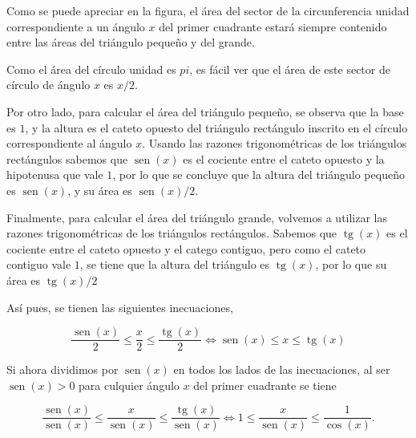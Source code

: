 \documentclass[
  spanish,
  a4paper,
]{scrreport}
\theoremstyle{definition}
\theoremstyle{remark}
\begin{document}
\begin{tcolorbox}[enhanced jigsaw, arc=.35mm, bottomrule=.15mm, bottomtitle=1mm, breakable, colback=white, colbacktitle=quarto-callout-tip-color!10!white, colframe=quarto-callout-tip-color-frame, coltitle=black, left=2mm, leftrule=.75mm, opacityback=0, opacitybacktitle=0.6, rightrule=.15mm, title=\textcolor{quarto-callout-tip-color}{\faLightbulb}\hspace{0.5em}{Solución}, titlerule=0mm, toprule=.15mm, toptitle=1mm]

Como se puede apreciar en la figura, el área del sector de la
circunferencia unidad correspondiente a un ángulo \(x\) del primer
cuadrante estará siempre contenido entre las áreas del triángulo pequeño
y del grande.

Como el área del círculo unidad es \(pi\), es fácil ver que el área de
este sector de círculo de ángulo \(x\) es \(x/2\).

Por otro lado, para calcular el área del triángulo pequeño, se observa
que la base es \(1\), y la altura es el cateto opuesto del triángulo
rectángulo inscrito en el círculo correspondiente al ángulo \(x\).
Usando las razones trigonométricas de los triángulos rectángulos sabemos
que \(\operatorname{sen}(x)\) es el cociente entre el cateto opuesto y
la hipotenusa que vale \(1\), por lo que se concluye que la altura del
triángulo pequeño es \(\operatorname{sen}(x)\), y su área es
\(\operatorname{sen}(x)/2\).

Finalmente, para calcular el área del triángulo grande, volvemos a
utilizar las razones trigonométricas de los triángulos rectángulos.
Sabemos que \(\operatorname{tg}(x)\) es el cociente entre el cateto
opuesto y el catego contiguo, pero como el cateto contiguo vale \(1\),
se tiene que la altura del triángulo es \(\operatorname{tg}(x)\), por lo
que su área es \(\operatorname{tg}(x)/2\)

Así pues, se tienen las siguientes inecuaciones,

\[
\frac{\operatorname{sen}(x)}{2}\leq \frac{x}{2}\leq \frac{\operatorname{tg}(x)}{2}
\Leftrightarrow \operatorname{sen}(x)\leq x\leq \operatorname{tg}(x)
\]

Si ahora dividimos por \(\operatorname{sen}(x)\) en todos los lados de
las inecuaciones, al ser \(\operatorname{sen}(x)>0\) para culquier
ángulo \(x\) del primer cuadrante se tiene

\[
\frac{\operatorname{sen}(x)}{\operatorname{sen}(x)}\leq \frac{x}{\operatorname{sen}(x)}\leq \frac{\operatorname{tg}(x)}{\operatorname{sen}(x)} 
\Leftrightarrow 1 \leq \frac{x}{\operatorname{sen}(x)}\leq \frac{1}{\cos(x)}. 
\]


\end{tcolorbox}
\end{document}
